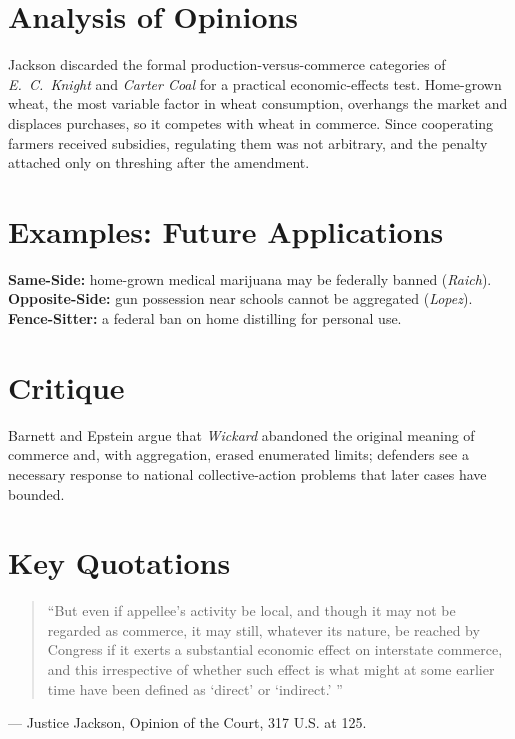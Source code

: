 \documentclass[12pt]{article}
\begin{document}
\section{Analysis of Opinions}
Jackson discarded the formal production-versus-commerce categories of \textit{E.\ C.\ Knight} and \textit{Carter Coal} for a practical economic-effects test. Home-grown wheat, the most variable factor in wheat consumption, overhangs the market and displaces purchases, so it competes with wheat in commerce. Since cooperating farmers received subsidies, regulating them was not arbitrary, and the penalty attached only on threshing after the amendment.

\section{Examples: Future Applications}
\textbf{Same-Side:} home-grown medical marijuana may be federally banned (\textit{Raich}). \textbf{Opposite-Side:} gun possession near schools cannot be aggregated (\textit{Lopez}). \textbf{Fence-Sitter:} a federal ban on home distilling for personal use.

\section{Critique}
Barnett and Epstein argue that \textit{Wickard} abandoned the original meaning of commerce and, with aggregation, erased enumerated limits; defenders see a necessary response to national collective-action problems that later cases have bounded.

\section{Key Quotations}
\begin{quote}
``But even if appellee's activity be local, and though it may not be regarded as commerce, it may still, whatever its nature, be reached by Congress if it exerts a substantial economic effect on interstate commerce, and this irrespective of whether such effect is what might at some earlier time have been defined as `direct' or `indirect.' ''
\end{quote}
\noindent --- Justice Jackson, Opinion of the Court, 317 U.S. at 125.
\end{document}
